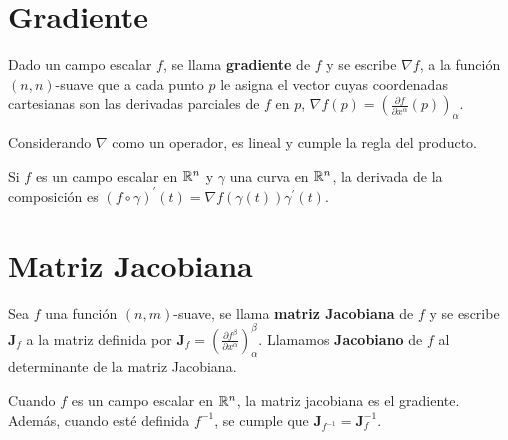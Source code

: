 \section{Gradiente}\label{sec:gradiente}
\begin{definition}
  Dado un campo escalar $f$, se llama \textbf{gradiente}\label{def:gradiente} de $f$ y se escribe $\nabla
  f$, a la función $(n,n)$-suave que a cada punto $p$ le asigna el vector cuyas
  coordenadas cartesianas son las derivadas parciales de $f$ en $p$, $\nabla f(p)=\left({\frac
  {\partial f}{\partial x^\alpha}}(p)\right)_\alpha$.
\end{definition}

Considerando $\nabla$ como un operador, es lineal y cumple la regla del producto.

\begin{theorem}\label{th:regla-cadena}
  Si $f$ es un campo escalar en $\mathbb{R}^n$ y $\gamma$ una curva en $\mathbb{R}^n$, la derivada de la composición
es $(f\circ\gamma)^{'}(t)=\nabla f(\gamma(t))\gamma^{'}(t)$.
\end{theorem}

\section{Matriz Jacobiana}\label{sec:matriz-jacobiana}
\begin{definition}
  Sea $f$ una función $(n,m)$-suave, se llama \textbf{matriz
  Jacobiana}\label{def:matriz-jacobiana} de $f$ y se escribe $\mathbf{J}_f$ a la matriz
  definida por
  $\mathbf{J}_f=\left({\frac {\partial f^\beta}{\partial x^\alpha}}\right)_\alpha^\beta$.
  Llamamos \textbf{Jacobiano}\label{def:jacobiano} de $f$ al determinante de la matriz Jacobiana.
\end{definition}
Cuando $f$ es un campo escalar en $\mathbb{R}^n$, la matriz jacobiana es el gradiente.
Además, cuando esté definida $f^{-1}$, se cumple que $\mathbf{J}_{f^{-1}}=\mathbf{J}_f^{-1}$.
